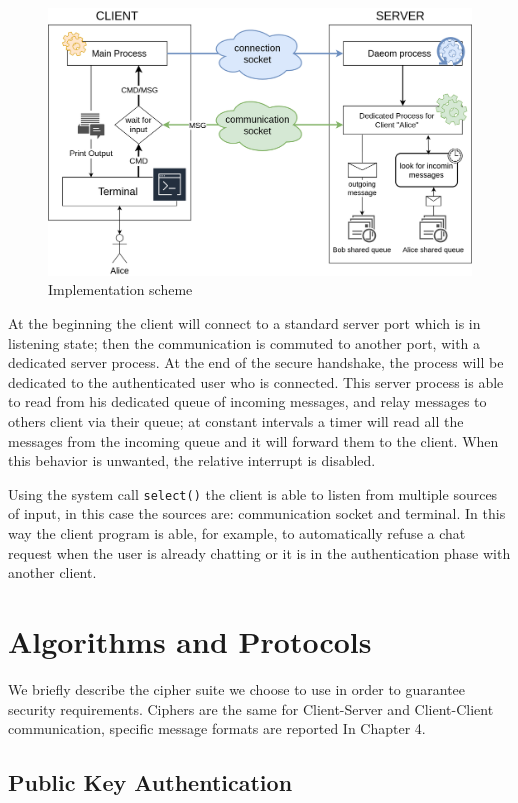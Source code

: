 \documentclass[11pt]{report}
\begin{document}
\begin{figure}[H]
	\centering
	\includegraphics[scale=0.24]{img/Implementation_scheme.png}
	\caption{Implementation scheme}
	\label {img: Implementation_scheme}
\end{figure}

\noindent At the beginning the client will connect to a standard server port which is in listening state; then the communication
is commuted to another port, with a dedicated server process. At the end of the secure handshake, the process will be 
dedicated to the authenticated user who is connected. This server process is able to read from his dedicated queue of 
incoming messages, and relay messages to others client via their queue; at constant intervals a timer will read all the 
messages from the incoming queue and it will forward them to the client. When this behavior is unwanted, the relative interrupt
is disabled.


\noindent Using the system call \texttt{select()} the client is able to listen from multiple sources of input, in this
case the sources are: communication socket and terminal. In this way the client program is able, for example, to automatically refuse a chat request 
when the user is already chatting or it is in the authentication phase with another client.

\section{Algorithms and Protocols}
We briefly describe the cipher suite we choose to use in order to guarantee security requirements.
Ciphers are the same for Client-Server and Client-Client communication, specific message formats are reported In
Chapter 4.
\subsection{Public Key Authentication}
\end{document}
